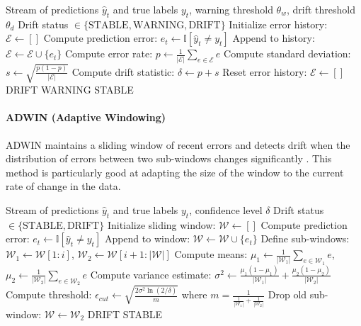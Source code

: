 \begin{algorithm}[H]
\caption{DDM Drift Detection}
\label{alg:ddm}
\begin{algorithmic}[1]
\REQUIRE Stream of predictions $\hat{y}_t$ and true labels $y_t$, warning threshold $\theta_w$, drift threshold $\theta_d$
\ENSURE Drift status $\in \{\text{STABLE}, \text{WARNING}, \text{DRIFT}\}$
\STATE Initialize error history: $\mathcal{E} \gets []$
    \STATE Compute prediction error: $e_t \gets \mathbb{I}[\hat{y}_t \neq y_t]$
    \STATE Append to history: $\mathcal{E} \gets \mathcal{E} \cup \{e_t\}$
    \STATE Compute error rate: $p \gets \frac{1}{|\mathcal{E}|}\sum_{e \in \mathcal{E}} e$
    \STATE Compute standard deviation: $s \gets \sqrt{\frac{p(1-p)}{|\mathcal{E}|}}$
    \STATE Compute drift statistic: $\delta \gets p + s$
        \STATE Reset error history: $\mathcal{E} \gets []$
        \RETURN DRIFT
        \RETURN WARNING
    \ELSE
        \RETURN STABLE
    \ENDIF
\ENDFOR
\end{algorithmic}
\end{algorithm}

\paragraph{ADWIN (Adaptive Windowing)}
ADWIN maintains a sliding window of recent errors and detects drift when the distribution of errors between two sub-windows changes significantly \cite{bifet2007learning}. This method is particularly good at adapting the size of the window to the current rate of change in the data.

\begin{algorithm}[H]
\caption{ADWIN Drift Detection}
\label{alg:adwin}
\begin{algorithmic}[1]
\REQUIRE Stream of predictions $\hat{y}_t$ and true labels $y_t$, confidence level $\delta$
\ENSURE Drift status $\in \{\text{STABLE}, \text{DRIFT}\}$
\STATE Initialize sliding window: $\mathcal{W} \gets []$
    \STATE Compute prediction error: $e_t \gets \mathbb{I}[\hat{y}_t \neq y_t]$
    \STATE Append to window: $\mathcal{W} \gets \mathcal{W} \cup \{e_t\}$
        \STATE Define sub-windows: $\mathcal{W}_1 \gets \mathcal{W}[1:i]$, $\mathcal{W}_2 \gets \mathcal{W}[i+1:|\mathcal{W}|]$
        \STATE Compute means: $\mu_1 \gets \frac{1}{|\mathcal{W}_1|}\sum_{e \in \mathcal{W}_1} e$, $\mu_2 \gets \frac{1}{|\mathcal{W}_2|}\sum_{e \in \mathcal{W}_2} e$
        \STATE Compute variance estimate: $\sigma^2 \gets \frac{\mu_1(1-\mu_1)}{|\mathcal{W}_1|} + \frac{\mu_2(1-\mu_2)}{|\mathcal{W}_2|}$
        \STATE Compute threshold: $\epsilon_{cut} \gets \sqrt{\frac{2\sigma^2 \ln(2/\delta)}{m}}$ where $m = \frac{1}{\frac{1}{|\mathcal{W}_1|} + \frac{1}{|\mathcal{W}_2|}}$
            \STATE Drop old sub-window: $\mathcal{W} \gets \mathcal{W}_2$
            \RETURN DRIFT
        \ENDIF
    \ENDFOR
    \RETURN STABLE
\ENDFOR
\end{algorithmic}
\end{algorithm}

